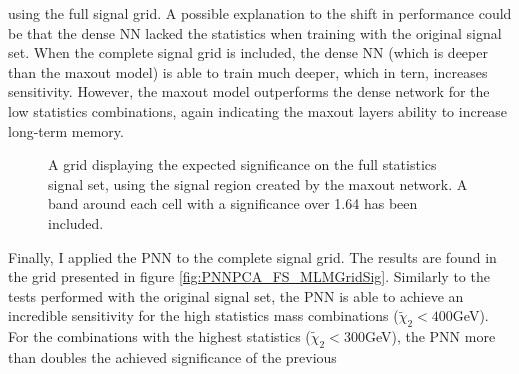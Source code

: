 using the full signal grid. A possible explanation to the shift in performance could be that the dense \ac{NN} lacked the statistics when training 
with the original signal set. When the complete signal grid is included, the dense \ac{NN} (which is deeper than the maxout model) is able to train 
much deeper, which in tern, increases sensitivity. However, the maxout model outperforms the dense network for the low statistics combinations, again 
indicating the maxout layers ability to increase long-term memory.\\
\begin{figure}
    \caption{A grid displaying the expected significance on the full statistics signal set, using the signal region 
    created by the maxout network. A band around each cell with a significance over 1.64 has been included.}
    \label{fig:MaxOutPCA_FS_MLMGridSig}
\end{figure}
Finally, I applied the \ac{PNN} to the complete signal grid. The results are found in the grid presented in figure \ref{fig:PNNPCA_FS_MLMGridSig}.
Similarly to the tests performed with the original signal set, the \ac{PNN} is able to achieve an incredible sensitivity for the high statistics mass combinations
($\tilde{\chi}_2<400$GeV). For the combinations with the highest statistics ($\tilde{\chi}_2<300$GeV), the \ac{PNN} more than doubles the achieved significance of the previous 

